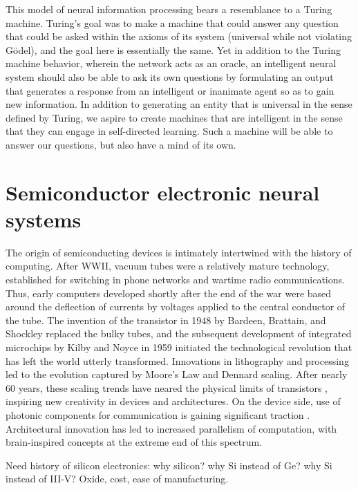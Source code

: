\documentclass[twocolumn]{article}
\begin{document}
This model of neural information processing bears a resemblance to a Turing machine. Turing's goal was to make a machine that could answer any question that could be asked within the axioms of its system (universal while not violating G\"{o}del), and the goal here is essentially the same. Yet in addition to the Turing machine behavior, wherein the network acts as an oracle, an intelligent neural system should also be able to ask its own questions by formulating an output that generates a response from an intelligent or inanimate agent so as to gain new information. In addition to generating an entity that is universal in the sense defined by Turing, we aspire to create machines that are intelligent in the sense that they can engage in self-directed learning. Such a machine will be able to answer our questions, but also have a mind of its own.

\section{\label{sec:electronics}Semiconductor electronic neural systems}
The origin of semiconducting devices is intimately intertwined with the history of computing. After WWII, vacuum tubes were a relatively mature technology, established for switching in phone networks and wartime radio communications. Thus, early computers developed shortly after the end of the war were based around the deflection of currents by voltages applied to the central conductor of the tube. The invention of the transistor in 1948 by Bardeen, Brattain, and Shockley replaced the bulky tubes, and the subsequent development of integrated microchips by Kilby and Noyce in 1959 initiated the technological revolution that has left the world utterly transformed. Innovations in lithography and processing led to the evolution captured by Moore's Law and Dennard scaling. After nearly 60 years, these scaling trends have neared the physical limits of transistors \cite{}, inspiring new creativity in devices and architectures. On the device side, use of photonic components for communication is gaining significant traction \cite{suwa2015,stra2018}. Architectural innovation has led to increased parallelism of computation, with brain-inspired concepts at the extreme end of this spectrum.

Need history of silicon electronics: why silicon? why Si instead of Ge? why Si instead of III-V? Oxide, cost, ease of manufacturing.
\end{document}
